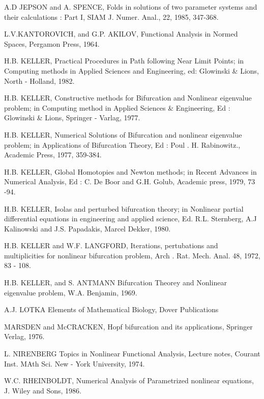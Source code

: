 \begin{thebibliography}{99}
 {A.D JEPSON and A. SPENCE,} Folds in solutions of two
  parameter systems and their calculations : Part I, SIAM
  J. Numer. Anal., 22, 1985, 347-368.  

 {L.V.KANTOROVICH, and G.P. AKILOV,} Functional Analysis
  in Normed Spaces, Pergamon Press, 1964. 

 {H.B. KELLER,} Practical Procedures in Path following
  Near Limit Points; in Computing methods in Applied Sciences and
  Engineering, ed: Glowinski \& Lions, North - Holland, 1982. 

 {H.B. KELLER,} Constructive methods for Bifurcation and
  Nonlinear eigenvalue problem; in Computing method in Applied
  Sciences \& Engineering, Ed : Glowinski \& Lions, Springer -
  Varlag, 1977. 

 {H.B. KELLER,} Numerical Solutions of Bifurcation and
  nonlinear eigenvalue problem; in Applications of Bifurcation Theory,
  Ed : Poul . H. Rabinowitz., Academic Press, 1977, 359-384. 

 {H.B. KELLER,} Global Homotopies and Newton methods; in
  Recent Advances in Numerical Analysis, Ed : C. De Boor and
  G.H. Golub, Academic press, 1979, 73 -94. 

 {H.B. KELLER,} Isolas and perturbed bifurcation theory;
  in Nonlinear partial differential equations in engineering and
  applied science, Ed. R.L. Sternberg, A.J Kalinowski and
  J.S. Papadakis, Marcel Dekker, 1980. 

 {H.B. KELLER and W.F. LANGFORD,} Iterations,
  pertubations and multiplicities for nonlinear bifurcation problem,
  Arch . Rat. Mech. Anal. 48, 1972, 83 - 108. 

 {H.B. KELLER, and S. ANTMANN} Bifurcation Theorey and
  Nonlinear eigenvalue problem, W.A. Benjamin, 1969. 

 {A.J. LOTKA} Elements of Mathematical Biology, Dover
  Publications 

 {MARSDEN and McCRACKEN,} Hopf bifurcation and its
  applications, Springer Verlag, 1976. 

 {L. NIRENBERG} Topics in Nonlinear Functional Analysis,
  Lecture notes, Courant Inst. MAth Sci. New - York University,
  1974. 

 {W.C. RHEINBOLDT,} Numerical Analysis of Parametrized
  nonlinear equations, J. Wiley and Sons, 1986. 


\end{thebibliography}
